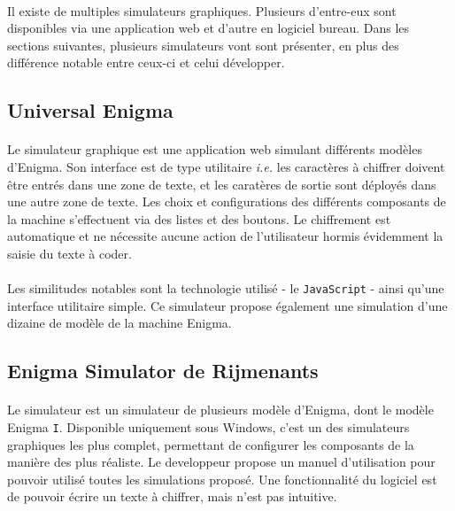 \documentclass[letterpaper]{article}
\begin{document}
\paragraph{}
Il existe de multiples simulateurs graphiques. Plusieurs d'entre-eux sont disponibles via une application web et d'autre en logiciel bureau. Dans les sections suivantes, plusieurs simulateurs vont sont présenter, en plus des différence notable entre ceux-ci et celui développer.

\subsection{Universal Enigma}

\paragraph{}
Le simulateur graphique \cite{UEN} est une application web simulant différents modèles d'Enigma. Son interface est de type utilitaire \textit{i.e.} les caractères à chiffrer doivent être entrés dans une zone de texte, et les caratères de sortie sont déployés dans une autre zone de texte. Les choix et configurations des différents composants de la machine s'effectuent via des listes et des boutons. Le chiffrement est automatique et ne nécessite aucune action de l'utilisateur hormis évidemment la saisie du texte à coder.

\paragraph{}
Les similitudes notables sont la technologie utilisé - le \texttt{JavaScript} - ainsi qu'une interface utilitaire simple. Ce simulateur propose également une simulation d'une dizaine de modèle de la machine Enigma.


\subsection{Enigma Simulator de Rijmenants}

\paragraph{}

Le simulateur \cite{EWIN} est un simulateur de plusieurs modèle d'Enigma, dont le modèle Enigma \texttt{I}. Disponible uniquement sous Windows, c'est un des simulateurs graphiques les plus complet, permettant de configurer les composants de la manière des plus réaliste. Le developpeur propose un manuel d'utilisation pour pouvoir utilisé toutes les simulations proposé. Une fonctionnalité du logiciel est de pouvoir écrire un texte à chiffrer, mais n'est pas intuitive.
\end{document}
